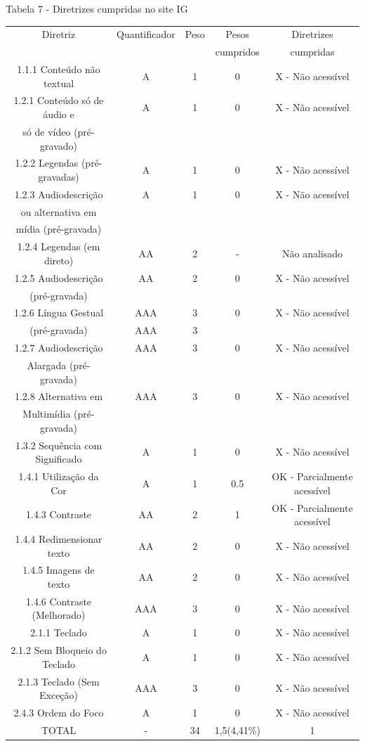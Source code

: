 \documentclass[a4paper]{article}
\begin{document}
\begin{titlepage}
Tabela 7 - Diretrizes cumpridas no site IG\\[-1cm]
\begin{center}
	\fontsize{8pt}{8pt}\selectfont	
	\begin{longtable}{|c|c|c|c|c|}
		\hline
		Diretriz & Quantificador & Peso & Pesos & Diretrizes\\
		& & & cumpridos & cumpridas\\
		\hline
		1.1.1 Conteúdo não textual & A & 1 & 0 & X - Não acessível \\
		\hline
		1.2.1 Conteúdo só de áudio e & A & 1 & 0 & X - Não acessível \\
		só de vídeo (pré-gravado) & & & & \\
		\hline
		1.2.2 Legendas (pré-gravadas) & A & 1 & 0 & X - Não acessível \\
		\hline
		1.2.3 Audiodescrição & A & 1 & 0 & X - Não acessível \\
		ou alternativa em & & & & \\
		mídia (pré-gravada) & & & & \\
		\hline
		1.2.4 Legendas (em direto) & AA & 2 & - & Não analisado \\
		\hline
		1.2.5 Audiodescrição & AA & 2 & 0 & X - Não acessível \\
		(pré-gravada) & & & & \\
		\hline
		1.2.6 Língua Gestual & AAA & 3 & 0 & X - Não acessível \\
		(pré-gravada) & AAA & 3 & & \\
		\hline
		1.2.7 Audiodescrição & AAA & 3 & 0 & X - Não acessível \\
		Alargada (pré-gravada) & & & & \\
		\hline
		1.2.8 Alternativa em & AAA & 3 & 0 & X - Não acessível \\
		Multimídia (pré-gravada) & & & & \\
		\hline
		1.3.2 Sequência com Significado & A & 1 & 0 & X - Não acessível \\
		\hline
		1.4.1 Utilização da Cor & A & 1 & 0.5 & OK - Parcialmente acessível \\
		\hline
		1.4.3 Contraste & AA & 2 & 1 & OK - Parcialmente acessível \\
		\hline
		1.4.4 Redimensionar texto & AA & 2 & 0 & X - Não acessível \\
		\hline
		1.4.5 Imagens de texto & AA & 2 & 0 & X - Não acessível \\
		\hline
		1.4.6 Contraste (Melhorado) & AAA & 3 & 0 & X - Não acessível \\
		\hline
		2.1.1 Teclado & A & 1 & 0 & X - Não acessível \\
		\hline
		2.1.2 Sem Bloqueio do Teclado & A & 1 & 0 & X - Não acessível \\
		\hline
		2.1.3 Teclado (Sem Exceção) & AAA & 3 & 0 & X - Não acessível \\
		\hline
		2.4.3 Ordem do Foco & A & 1 & 0 & X - Não acessível \\
		\hline
		TOTAL & - & 34 & 1,5(4,41\%) & 1 \\
		\hline
	\end{longtable}
\end{center}


\end{titlepage}
\end{document}

